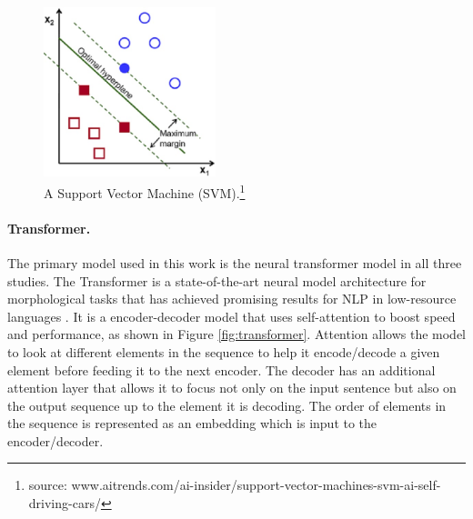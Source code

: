 
\begin{figure}[b]
    \centering
    \includegraphics[width=5cm]{figs/SVM1.jpg}
    \caption[Support Vector Machine]{A Support Vector Machine (SVM).\footnote{source: www.aitrends.com/ai-insider/support-vector-machines-svm-ai-self-driving-cars/}}
    \label{fig:SVM}
\end{figure}

\paragraph{Transformer.} 
The primary model used in this work is the neural transformer model \citep{vaswani_attention_2017} in all three studies. The Transformer is a state-of-the-art neural model architecture for morphological tasks \citep{vylomova2020sigmorphon} that has achieved promising results for NLP in low-resource languages \citep{abbott_towards_2018,Martinus2019AFO}. 
It is a encoder-decoder model that uses self-attention to boost speed and performance, as shown in Figure \ref{fig:transformer}. Attention allows the model to look at different elements in the sequence to help it encode/decode a given element before feeding it to the next encoder. The decoder has an additional attention layer that allows it to focus not only on the input sentence but also on the output sequence up to the element it is decoding. The order of elements in the sequence is represented as an embedding which is input to the encoder/decoder. 

